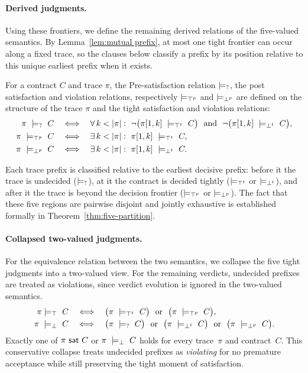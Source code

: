 \paragraph{Derived judgments.}
Using these frontiers, we define the remaining derived relations of the five-valued semantics.
By Lemma~\ref{lem:mutual prefix}, at most one tight frontier can occur along a fixed trace, so the clauses below classify a prefix by its position relative to this unique earliest prefix when it exists.

\begin{definition}\label{def:postprecont}
For a contract $C$ and trace $\pi$, the Pre-satisfaction relation $\models_{?}$, the post satisfaction and violation relations, respectively $\models_{\top^p}$ and $\models_{\bot^p}$ are defined on the structure of the trace $\pi$ and the tight satisfaction and violation relations:
\[
\begin{array}{rcl}
\pi\ \presat\ C
&\iff&
\forall\,k<|\pi|:\ \neg\big(\pi[1,k]\ \satt\ C\big)\ \nd\ \neg\big(\pi[1,k]\ \violt\ C\big),
\\[0.8ex]
\pi\ \postsat\ C
&\iff&
\exists\,k<|\pi|:\ \pi[1,k]\ \satt\ C,
\\[0.8ex]
\pi\ \postviol\ C
&\iff&
\exists\,k<|\pi|:\ \pi[1,k]\ \violt\ C.
\end{array}
\]
\end{definition}
Each trace prefix is classified relative to the earliest decisive prefix: before it the trace is undecided ($\models_{?}$), at it the contract is decided tightly ($\models_{\top^t}$ or $\models_{\bot^t}$), and after it the trace is beyond the decision frontier ($\models_{\top^p}$ or $\models_{\bot^p}$).
The fact that these five regions are pairwise disjoint and jointly exhaustive is established formally in Theorem~\ref{thm:five-partition}.

\paragraph{Collapsed two-valued judgments.}
For  the equivalence relation between the two semantics, we collapse the five tight judgments into a two-valued view.
For the remaining verdicts, undecided prefixes are treated as violations, since verdict evolution is ignored in the two-valued semantics.
\[
\begin{array}{rcl}
\pi \models_\top \ C
&\iff&
\big(\pi\ \satt\ C\big)\ \sor\ \big(\pi\ \postsat\ C\big),
\\[0.6ex]
\pi\ \viol\ C
&\iff&
\big(\pi\ \presat\ C\big)\ \sor\ \big(\pi\ \violt\ C\big)\ \sor\ \big(\pi\ \postviol\ C\big).
\end{array}
\]
Exactly one of $\pi\ \sat\ C$ or $\pi\ \models_{\perp}\ C$ holds for every trace~$\pi$ and contract~$C$.
This conservative collapse treats undecided prefixes as \emph{violating}
for no premature acceptance while still preserving the tight moment of satisfaction.

